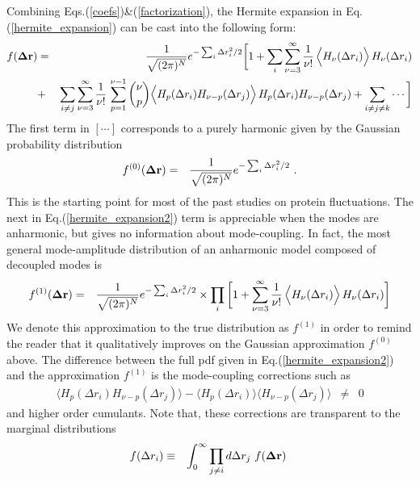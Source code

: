 \documentclass{article}
\begin{document}
Combining Eqs.(\ref{coefs})\&(\ref{factorization}), the Hermite
expansion in Eq.(\ref{hermite_expansion}) can be cast into the
following form:
\begin{eqnarray}
\label{hermite_expansion2}
f({\bf\Delta r}) &=& \frac{1}{\sqrt{(2\pi)^N}} e^{ -\sum_i \Delta
  r_i^2/2} \bigg[ 1 + \sum_i\sum_{\nu=3}^\infty
  \frac{1}{\nu!}\, \Big\langle
  H_\nu(\Delta r_i)\Big\rangle\,H_\nu(\Delta r_i) \nonumber \\
&+&  \sum_{i\ne j}\sum_{\nu=3}^\infty
  \frac{1}{\nu!}\,\sum_{p=1}^{\nu-1} {\nu\choose p} \Big\langle
  H_p(\Delta r_i)H_{\nu-p}(\Delta r_j)\Big\rangle\,H_p(\Delta r_i)H_{\nu-p}(\Delta r_j) + \sum_{i\ne j\ne k} \cdots \bigg]
\end{eqnarray}
The first term in $[\cdots]$ corresponds to a purely harmonic given by
the Gaussian probability distribution
\begin{eqnarray}
\label{hermite_expansion3}
f^{(0)}({\bf\Delta r}) &=& \frac{1}{\sqrt{(2\pi)^N}} e^{ -\sum_i \Delta
  r_i^2/2}\ .
\end{eqnarray}
This is the starting point for most of the past studies on protein
fluctuations\cite{}. The next in Eq.(\ref{hermite_expansion2}) term is
appreciable when the modes are anharmonic, but gives no information
about mode-coupling. In fact, the most general mode-amplitude
distribution of an anharmonic model composed of decoupled modes is
\begin{eqnarray}
\label{decoupled}
f^{(1)}({\bf\Delta r}) &=& \frac{1}{\sqrt{(2\pi)^N}} e^{ -\sum_i \Delta
  r_i^2/2}\times \prod_i \bigg[ 1 + \sum_{\nu=3}^\infty
  \frac{1}{\nu!}\, \Big\langle
  H_\nu(\Delta r_i)\Big\rangle\,H_\nu(\Delta r_i)\bigg]
\end{eqnarray}
We denote this approximation to the true distribution as $f^{(1)}$ in
order to remind the reader that it qualitatively improves on the
Gaussian approximation $f^{(0)}$ above. The difference between the
full pdf given in Eq.(\ref{hermite_expansion2}) and the approximation
$f^{(1)}$ is the mode-coupling corrections such as
\begin{eqnarray}
\langle H_p(\Delta r_i)H_{\nu-p}(\Delta r_j)\rangle - \langle
H_p(\Delta r_i)\rangle\langle H_{\nu-p}(\Delta r_j)\rangle &\neq& 0 \nonumber
\end{eqnarray}
and higher order cumulants. Note that, these corrections are transparent to the
marginal distributions
\begin{eqnarray}
\label{marginal}
f(\Delta r_i) &\equiv& \int_0^\infty \prod_{j\ne i}d\Delta r_j\ f({\bf\Delta r})\ 
\end{eqnarray}
\end{document}
